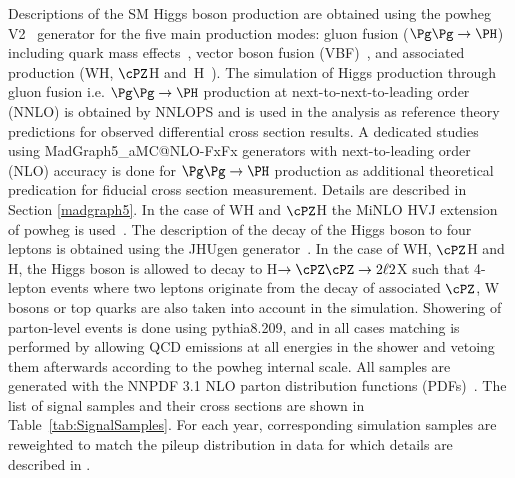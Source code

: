 Descriptions of the SM Higgs boson production are obtained using the 
{\sc powheg V2}~\cite{Alioli:2008gx,Nason:2004rx,Frixione:2007vw} generator for the five main production modes: 
gluon fusion ($\ggH$) including quark mass effects~\cite{Bagnaschi:2011tu}, vector boson fusion 
(VBF)~\cite{Nason:2009ai}, and associated production (WH, $\cPZ$H and \ttbar$\,$H~\cite{Hartanto:2015uka}). 
The simulation of Higgs production through gluon fusion i.e. $\ggH$ production at next-to-next-to-leading order (NNLO) is obtained by {\sc NNLOPS} \cite{Hamilton:2013fea} and is used in the analysis as reference theory predictions for observed differential cross section results. A dedicated studies using {\sc MadGraph5\_aMC@NLO-FxFx} generators with next-to-leading order (NLO) accuracy is done for $\ggH$ production as additional theoretical predication for fiducial cross section measurement. Details are described in Section \ref{madgraph5}. 
In the case of WH and $\cPZ$H the {\sc MiNLO HVJ} extension of {\sc powheg} is used~\cite{Luisoni:2013kna}. 
The description of the decay of the Higgs boson to four leptons is obtained using the {\sc JHUgen} 
generator~\cite{Gao:2010qx}. In the case of WH, $\cPZ$H and \ttbar$\,$H, the Higgs boson is allowed
to decay to H$\to \cPZ \cPZ \to 2\ell2$X such that 4-lepton events where two leptons originate from 
the decay of associated $\cPZ$, W bosons or top quarks are also taken into account in the simulation. 
Showering of parton-level events is done using {\sc pythia8.209}, and in all cases matching is performed by 
allowing QCD emissions at all energies in the shower and vetoing them afterwards according to the 
{\sc powheg} internal scale. All samples are generated with the NNPDF 3.1 NLO parton distribution 
functions (PDFs)~\cite{Ball:2014uwa}. The list of signal samples and their cross sections are shown in 
Table~\ref{tab:SignalSamples}. For each year, corresponding simulation samples are reweighted to match the pileup distribution in data for which details are described in \cite{CMS-PAS-HIG-19-001}.

